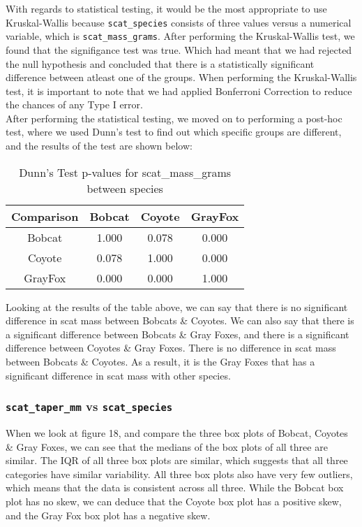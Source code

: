 \documentclass[a4paper]{article}
\begin{document}
\noindent With regards to statistical testing, it would be the most appropriate to use Kruskal-Wallis because \texttt{scat\_species} consists of three values
versus a numerical variable, which is \texttt{scat\_mass\_grams}. After performing the Kruskal-Wallis test, we found that the signifigance test was true. 
Which had meant that we had rejected the null hypothesis and concluded that there is a statistically significant difference between atleast one of the groups.
When performing the Kruskal-Wallis test, it is important to note that we had applied Bonferroni Correction to reduce the chances of any Type I error. \\

\noindent After performing the statistical testing, we moved on to performing a post-hoc test, where we used Dunn's test to find out which specific groups are
different, and the results of the test are shown below: \\

\begin{table}[H]
    \centering
    \begin{tabular}{|c|c|c|c|}
    \hline
    \textbf{Comparison} & \textbf{Bobcat} & \textbf{Coyote} & \textbf{GrayFox} \\
    \hline
    Bobcat & 1.000 & 0.078 & 0.000 \\
    \hline
    Coyote & 0.078 & 1.000 & 0.000 \\
    \hline
    GrayFox & 0.000 & 0.000 & 1.000 \\
    \hline
    \end{tabular}
    \caption{Dunn's Test p-values for scat\_mass\_grams between species}
    \label{tab:dunn_scat_mass}
\end{table}

\noindent Looking at the results of the table above, we can say that there is no significant difference in scat mass between Bobcats \& Coyotes. We can also
say that there is a significant difference between Bobcats \& Gray Foxes, and there is a significant difference between Coyotes \& Gray Foxes. There is no
difference in scat mass between Bobcats \& Coyotes. As a result, it is the Gray Foxes that has a significant difference in scat mass with other species.

\subsubsection{\texttt{scat\_taper\_mm} vs \texttt{scat\_species}}
When we look at figure 18, and compare the three box plots of Bobcat, Coyotes \& Gray Foxes, we can see that the medians of the box plots of all three are
similar. The IQR of all three box plots are similar, which suggests that all three categories have similar variability. All three box plots also have very 
few outliers, which means that the data is consistent across all three. While the Bobcat box plot has no skew, we can deduce that the Coyote box plot has a 
positive skew, and the Gray Fox box plot has a negative skew. \\
\end{document}

